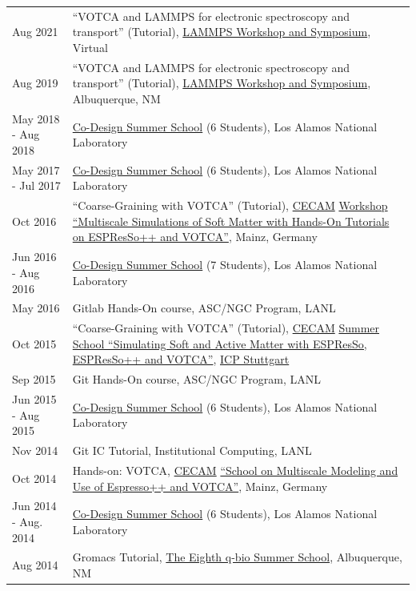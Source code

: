 \documentclass{article}
\begin{document}
\begin{longtable}{p{}p{}}
Aug 2021 & ``VOTCA and LAMMPS for electronic spectroscopy and transport'' (Tutorial), \href{https://www.lammps.org/workshops/Aug21}{LAMMPS Workshop and Symposium}, Virtual\\
Aug 2019 & ``VOTCA and LAMMPS for electronic spectroscopy and transport'' (Tutorial), \href{https://www.lammps.org/workshops/Aug19/workshop.html}{LAMMPS Workshop and Symposium}, Albuquerque, NM \\
May 2018 - Aug 2018 & \href{http://codesign.lanl.gov}{Co-Design Summer School} (6 Students), Los Alamos National Laboratory \\
May 2017 - Jul 2017 & \href{http://codesign.lanl.gov}{Co-Design Summer School} (6 Students), Los Alamos National Laboratory \\
Oct 2016 & ``Coarse-Graining with VOTCA'' (Tutorial), \href{http://www.cecam.org}{CECAM} \href{https://www.cecam.org/workshop-details/327}{Workshop ``Multiscale Simulations of Soft Matter with Hands-On Tutorials on ESPResSo++ and VOTCA''}, Mainz, Germany \\
Jun 2016 - Aug 2016 & \href{http://codesign.lanl.gov}{Co-Design Summer School} (7 Students), Los Alamos National Laboratory \\
May  2016 & Gitlab Hands-On course, ASC/NGC Program, LANL \\
Oct 2015 & ``Coarse-Graining with VOTCA'' (Tutorial), \href{http://www.cecam.org}{CECAM} \href{http://espressomd.org/wordpress/community-and-support/espresso-summer-school-2015/}{Summer School ``Simulating Soft and Active Matter with ESPResSo, ESPResSo++ and VOTCA''}, \href{http://www.icp.uni-stuttgart.de/}{ICP Stuttgart} \\
Sep 2015 & Git Hands-On course, ASC/NGC Program, LANL \\
Jun 2015 - Aug 2015 & \href{http://codesign.lanl.gov}{Co-Design Summer School} (6 Students), Los Alamos National Laboratory \\
Nov 2014 & Git IC Tutorial, Institutional Computing, LANL \\
Oct 2014 & Hands-on: VOTCA, \href{http://www.cecam.org}{CECAM} \href{https://www.cecam.org/workshop-details/505}{``School on Multiscale Modeling and Use of Espresso++ and VOTCA''}, Mainz, Germany \\
Jun 2014 - Aug. 2014 & \href{http://codesign.lanl.gov}{Co-Design Summer School} (6 Students), Los Alamos National Laboratory \\
Aug 2014 & Gromacs Tutorial, \href{http://q-bio.org/wiki/The\_Eighth\_q-bio\_Summer\_School}{The Eighth q-bio Summer School}, Albuquerque, NM \\

\end{longtable}
\end{document}
